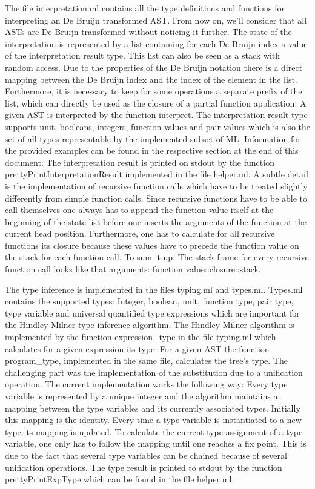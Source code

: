 \documentclass[a4paper, 12pt, titlepage]{article}
\begin{document}
The file interpretation.ml contains all the type definitions and functions for interpreting an De Bruijn transformed AST. From now on, we'll consider that all ASTs are De Bruijn transformed without noticing it further. The state of the interpretation is represented by a list containing for each De Bruijn index a value of the interpretation result type. This list can also be seen as a stack with random access. Due to the properties of the De Bruijn notation there is a direct mapping between the De Bruijn index and the index of the element in the list. Furthermore, it is necessary to keep for some operations a separate prefix of the list, which can directly be used as the closure of a partial function application. A given AST is interpreted by the function interpret. The interpretation result type supports unit, booleans, integers, function values and pair values which is also the set of all types representable by the implemented subset of ML. Information for the provided examples can be found in the respective section at the end of this document. The interpretation result is printed on stdout by the function prettyPrintInterpretationResult implemented in the file helper.ml. A subtle detail is the implementation of recursive function calls which have to be treated slightly differently from simple function calls. Since recursive functions have to be able to call themselves one always has to append the function value itself at the beginning of the state list before one inserts the arguments of the function at the current head position. Furthermore, one has to calculate for all recursive functions its closure because these values have to precede the function value on the stack for each function call. To sum it up: The stack frame for every recursive function call looks like that arguments::function value::closure::stack.

The type inference is implemented in the files typing.ml and types.ml. Types.ml contains the supported types: Integer, boolean, unit, function type, pair type, type variable and universal quantified type expressions which are important for the Hindley-Milner type inference algorithm. The Hindley-Milner algorithm is implemented by the function expression\_type in the file typing.ml which calculates for a given expression its type. For a given AST the function program\_type, implemented in the same file, calculates the tree's type. The challenging part was the implementation of the substitution due to a unification operation. The current implementation works the following way: Every type variable is represented by a unique integer and the algorithm maintains a mapping between the type variables and its currently associated types. Initially this mapping is the identity. Every time a type variable is instantiated to a new type its mapping is updated. To calculate the current type assignment of a type variable, one only has to follow the mapping until one reaches a fix point. This is due to the fact that several type variables can be chained because of several unification operations. The type result is printed to stdout by the function prettyPrintExpType which can be found in the file helper.ml.
\end{document}
